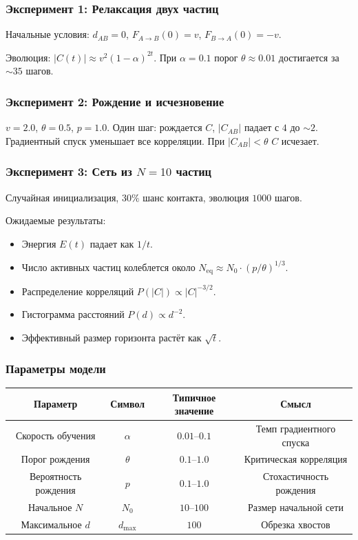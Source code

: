 \documentclass[12pt,a4paper]{article}
\begin{document}
\subsubsection{Эксперимент 1: Релаксация двух частиц}

Начальные условия: $d_{AB} = 0$, $F_{A \to B}(0) = v$, $F_{B \to A}(0) = -v$.

Эволюция: $|C(t)| \approx v^2 (1 - \alpha)^{2t}$. При $\alpha = 0.1$ порог $\theta \approx 0.01$ достигается за $\sim 35$ шагов.

\subsubsection{Эксперимент 2: Рождение и исчезновение}

$v = 2.0$, $\theta = 0.5$, $p = 1.0$. Один шаг: рождается $C$, $|C_{AB}|$ падает с $4$ до $\sim 2$. Градиентный спуск уменьшает все корреляции. При $|C_{AB}| < \theta$ $C$ исчезает.

\subsubsection{Эксперимент 3: Сеть из $N=10$ частиц}

Случайная инициализация, $30\%$ шанс контакта, эволюция $1000$ шагов.

Ожидаемые результаты:
\begin{itemize}
    \item Энергия $E(t)$ падает как $1/t$.
    \item Число активных частиц колеблется около $N_{\text{eq}} \approx N_0 \cdot (p/\theta)^{1/3}$.
    \item Распределение корреляций $P(|C|) \propto |C|^{-3/2}$.
    \item Гистограмма расстояний $P(d) \propto d^{-2}$.
    \item Эффективный размер горизонта растёт как $\sqrt{t}$.
\end{itemize}

\subsubsection{Параметры модели}

\begin{center}
\begin{tabular}{c|c|c|c}
Параметр & Символ & Типичное значение & Смысл \\
\hline
Скорость обучения & $\alpha$ & $0.01$--$0.1$ & Темп градиентного спуска \\
Порог рождения & $\theta$ & $0.1$--$1.0$ & Критическая корреляция \\
Вероятность рождения & $p$ & $0.1$--$1.0$ & Стохастичность рождения \\
Начальное $N$ & $N_0$ & $10$--$100$ & Размер начальной сети \\
Максимальное $d$ & $d_{\max}$ & $100$ & Обрезка хвостов
\end{tabular}
\end{center}
\end{document}
